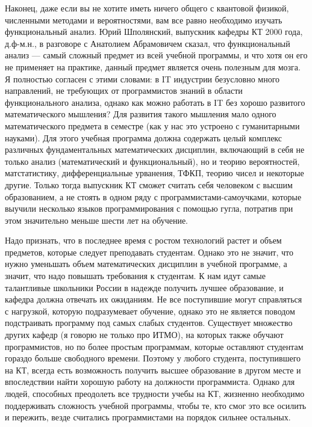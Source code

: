 \documentclass[russian]{article}
\begin{document}
Наконец, даже если вы не хотите иметь ничего общего с квантовой физикой, численными методами и вероятностями, вам все равно необходимо изучать функциональный анализ. Юрий Шполянский, выпускник кафедры КТ 2000 года, д.ф-м.н., в разговоре с Анатолием Абрамовичем сказал, что функциональный анализ --- самый сложный предмет из всей учебной программы, и что хотя он его не применяет на практике, данный предмет является очень полезным для мозга. Я полностью согласен с этими словами: в IT индустрии безусловно много направлений, не требующих от программистов знаний в области функционального анализа, однако как можно работать в IT без хорошо развитого математического мышления? Для развития такого мышления мало одного математического предмета в семестре (как у нас это устроено с гуманитарными науками). Для этого учебная программа должна содержать целый комплекс различных фундаментальных математических дисциплин, включающий в себя не только анализ (математический и функциональный), но и теорию вероятностей, матстатистику, дифференциальные урванения, ТФКП, теорию чисел и некоторые другие. Только тогда выпускник КТ сможет считать себя человеком с высшим образованием, а не стоять в одном ряду с программистами-самоучками, которые выучили несколько языков программирования с помощью гугла, потратив при этом значительно меньше шести лет на обучение.

Надо признать, что в последнее время с ростом технологий растет и объем предметов, которые следует преподавать студентам. Однако это не значит, что нужно уменьшать объем математических дисциплин в учебной программе, а значит, что надо повышать требования к студентам. К нам идут самые талантливые школьники России в надежде получить лучшее образование, и кафедра должна отвечать их ожиданиям. Не все поступившие могут справляться с нагрузкой, которую подразумевает обучение, однако это не является поводом подстраивать программу под самых слабых студентов. Существует множество других кафедр (я говорю не только про ИТМО), на которых также обучают программистов, но по более простым программам, которые оставляют студентам гораздо больше свободного времени. Поэтому у любого студента, поступившего на КТ, всегда есть возможность получить высшее образование в другом месте и впоследствии найти хорошую работу на должности программиста. Однако для людей, способных преодолеть все трудности учебы на КТ, жизненно необходимо поддерживать сложность учебной программы, чтобы те, кто смог это все осилить и пережить, везде считались программистами на порядок сильнее остальных.
\end{document}
